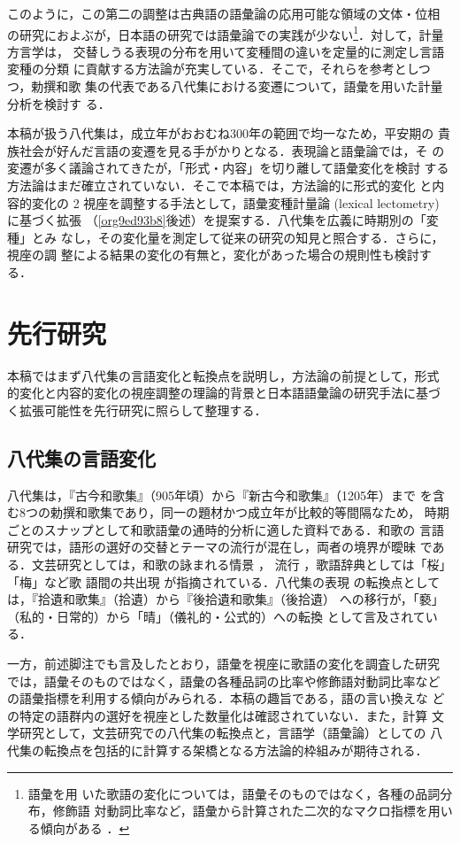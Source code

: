 \documentclass[submit]{ipsj}
\renewcommand{\ref}{\cref}
\begin{document}
このように，この第二の調整は古典語の語彙論の応用可能な領域の文体・位相
の研究におよぶが，日本語の研究では語彙論での実践が少ない\footnote{語彙を用
いた歌語の変化については，語彙そのものではなく，各種の品詞分布，修飾語
対動詞比率など，語彙から計算された二次的なマクロ指標を用いる傾向がある
\cite{nishihata1992Waka,hatano1941Waka}．}．対して，計量方言学は，
交替しうる表現の分布を用いて変種間の違いを定量的に測定し言語変種の分類
に貢献する方法論が充実している．そこで，それらを参考としつつ，勅撰和歌
集の代表である八代集における変遷について，語彙を用いた計量分析を検討す
る．

本稿が扱う八代集は，成立年がおおむね300年の範囲で均一なため，平安期の
貴族社会が好んだ言語の変遷を見る手がかりとなる．表現論と語彙論では，そ
の変遷が多く議論されてきたが，「形式・内容」を切り離して語彙変化を検討
する方法論はまだ確立されていない．そこで本稿では，方法論的に形式的変化
と内容的変化の 2 視座を調整する手法として，語彙変種計量論 (lexical
lectometry) \cite{Speelman2003Profilebased} に基づく拡張
（\ref{org9ed93b8}後述）を提案する．八代集を広義に時期別の「変種」とみ
なし，その変化量を測定して従来の研究の知見と照合する．さらに，視座の調
整による結果の変化の有無と，変化があった場合の規則性も検討する．
\section{先行研究\label{org460ab00}}
\label{sec:org1601f1b}
本稿ではまず八代集の言語変化と転換点を説明し，方法論の前提として，形式
的変化と内容的変化の視座調整の理論的背景と日本語語彙論の研究手法に基づ
く拡張可能性を先行研究に照らして整理する．
\subsection{八代集の言語変化\label{orge3a8deb}}
\label{sec:org5fd4c84}
八代集は，『古今和歌集』（905年頃）から『新古今和歌集』（1205年）まで
を含む8つの勅撰和歌集であり，同一の題材かつ成立年が比較的等間隔なため，
時期ごとのスナップとして和歌語彙の通時的分析に適した資料である．和歌の
言語研究では，語形の選好の交替とテーマの流行が混在し，両者の境界が曖昧
である．文芸研究としては，和歌の詠まれる情景 \cite{ueno1976Koshui}，
流行 \cite{kawamura1991Sekkan}，歌語辞典としては「桜」「梅」など歌
語間の共出現 \cite{katagiri1983Uta} が指摘されている．八代集の表現
の転換点としては，『拾遺和歌集』（拾遺）から『後拾遺和歌集』（後拾遺）
への移行が，「褻」（私的・日常的）から「晴」（儀礼的・公式的）への転換
として言及されている\cite{ueno1976Koshui,kawamura1991Sekkan}．

一方，前述脚注でも言及したとおり，語彙を視座に歌語の変化を調査した研究
では，語彙そのものではなく，語彙の各種品詞の比率や修飾語対動詞比率など
の語彙指標を利用する傾向がみられる\cite{tsuji1998Uta,nishihata1992Waka,hatano1941Waka}．本稿の趣旨である，語の言い換えな
どの特定の語群内の選好を視座とした数量化は確認されていない．また，計算
文学研究として，文芸研究での八代集の転換点と，言語学（語彙論）としての
八代集の転換点を包括的に計算する架橋となる方法論的枠組みが期待される．
\end{document}
